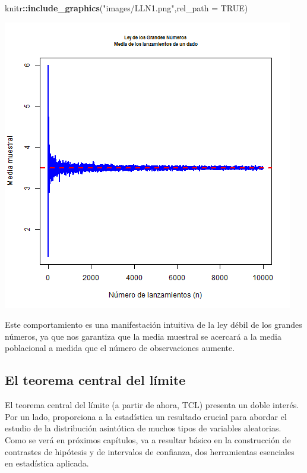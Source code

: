 \documentclass[
]{article}
\newenvironment{Shaded}{\begin{snugshade}}{\end{snugshade}}
\newcommand{\AttributeTok}[1]{\textcolor[rgb]{0.13,0.29,0.53}{#1}}
\newcommand{\ConstantTok}[1]{\textcolor[rgb]{0.56,0.35,0.01}{#1}}
\newcommand{\FunctionTok}[1]{\textcolor[rgb]{0.13,0.29,0.53}{\textbf{#1}}}
\newcommand{\NormalTok}[1]{#1}
\newcommand{\SpecialCharTok}[1]{\textcolor[rgb]{0.81,0.36,0.00}{\textbf{#1}}}
\newcommand{\StringTok}[1]{\textcolor[rgb]{0.31,0.60,0.02}{#1}}
\begin{document}
\begin{Shaded}
\begin{Highlighting}[]
\NormalTok{knitr}\SpecialCharTok{::}\FunctionTok{include\_graphics}\NormalTok{(}\StringTok{"images/LLN1.png"}\NormalTok{,}\AttributeTok{rel\_path =} \ConstantTok{TRUE}\NormalTok{)}
\end{Highlighting}
\end{Shaded}

\begin{center}\includegraphics[width=0.9\linewidth]{images/LLN1} \end{center}

Este comportamiento es una manifestación intuitiva de la ley débil de los grandes números, ya que nos garantiza que la media muestral se acercará a la media poblacional a medida que el número de observaciones aumente.

\subsection{El teorema central del límite}\label{el-teorema-central-del-luxedmite}

El teorema central del límite (a partir de ahora, TCL) presenta un doble interés. Por un lado, proporciona a la estadística un resultado crucial para abordar el estudio de la distribución asintótica de muchos tipos de variables aleatorias. Como se verá en próximos capítulos, va a resultar básico en la construcción de contrastes de hipótesis y de intervalos de confianza, dos herramientas esenciales en estadística aplicada.
\end{document}
